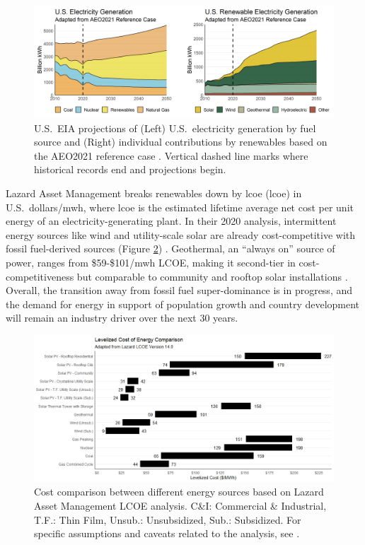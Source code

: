 \begin{figure}[htp]
\centering
\includegraphics[width=\textwidth]{templates/images/Figure-EIA_projections.png}
\caption[U.S.\ EIA projections based on the AEO2021 reference case]{U.S.\ EIA projections of (Left) U.S.\ electricity generation by fuel source and (Right) individual contributions by renewables based on the AEO2021 reference case \protect\citep{eia_annual_2021}. Vertical dashed line marks where historical records end and projections begin.}
\label{fig:eia_2021_projections}
\end{figure}

Lazard Asset Management breaks renewables down by \acrlong{lcoe} (\acrshort{lcoe}) in U.S.\ dollars/\acrshort{mwh}, where \acrshort{lcoe} is the estimated lifetime average net cost per unit energy of an electricity-generating plant. In their 2020 analysis, intermittent energy sources like wind and utility-scale solar are already cost-competitive with fossil fuel-derived sources (Figure \ref{fig:lazard_lcoe}) \citep{lazard_lazards_2020}. Geothermal, an “always on” source of power, ranges from \$59-\$101/\acrshort{mwh} LCOE, making it second-tier in cost-competitiveness but comparable to community and rooftop solar installations \citep{lazard_lazards_2020}. Overall, the transition away from fossil fuel super-dominance is in progress, and the demand for energy in support of population growth and country development will remain an industry driver over the next 30 years.
 
\begin{figure}[htp]
\centering
\includegraphics[width=\textwidth]{templates/images/Figure-Lazard_LCOE_recreated.jpeg}
\caption[Lazard Levelized Cost of Energy 2021 projections]{Cost comparison between different energy sources based on Lazard Asset Management LCOE analysis. C\&I: Commercial \& Industrial, T.F.: Thin Film, Unsub.: Unsubsidized, Sub.: Subsidized. For specific assumptions and caveats related to the analysis, see \protect\citep{lazard_lazards_2020}.}
\label{fig:lazard_lcoe}
\end{figure}

